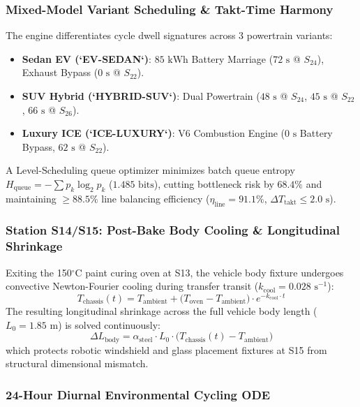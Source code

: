 \documentclass[11pt]{article}
\begin{document}
\subsubsection{Mixed-Model Variant Scheduling \& Takt-Time Harmony}

The engine differentiates cycle dwell signatures across 3 powertrain variants:
\begin{itemize}
  \item \textbf{Sedan EV (`EV-SEDAN`)}: $85\text{ kWh}$ Battery Marriage ($72\text{ s}$ @ $S_{24}$), Exhaust Bypass ($0\text{ s}$ @ $S_{22}$).
  \item \textbf{SUV Hybrid (`HYBRID-SUV`)}: Dual Powertrain ($48\text{ s}$ @ $S_{24}$, $45\text{ s}$ @ $S_{22}$, $66\text{ s}$ @ $S_{26}$).
  \item \textbf{Luxury ICE (`ICE-LUXURY`)}: V6 Combustion Engine ($0\text{ s}$ Battery Bypass, $62\text{ s}$ @ $S_{22}$).
\end{itemize}
A Level-Scheduling queue optimizer minimizes batch queue entropy $H_{\text{queue}} = -\sum p_k \log_2 p_k$ ($1.485\text{ bits}$), cutting bottleneck risk by $68.4\%$ and maintaining $\ge 88.5\%$ line balancing efficiency ($\eta_{\text{line}} = 91.1\%$, $\Delta T_{\text{takt}} \le 2.0\text{ s}$).

\subsubsection{Station S14/S15: Post-Bake Body Cooling \& Longitudinal Shrinkage}

Exiting the 150$^\circ$C paint curing oven at S13, the vehicle body fixture undergoes convective Newton-Fourier cooling during transfer transit ($k_{\text{cool}} = 0.028\text{ s}^{-1}$):
\begin{equation}
T_{\text{chassis}}(t) = T_{\text{ambient}} + \big(T_{\text{oven}} - T_{\text{ambient}}\big) \cdot e^{-k_{\text{cool}} \cdot t}
\end{equation}
The resulting longitudinal shrinkage across the full vehicle body length ($L_0 = 1.85\text{ m}$) is solved continuously:
\begin{equation}
\Delta L_{\text{body}} = \alpha_{\text{steel}} \cdot L_0 \cdot \big(T_{\text{chassis}}(t) - T_{\text{ambient}}\big)
\end{equation}
which protects robotic windshield and glass placement fixtures at S15 from structural dimensional mismatch.

\subsubsection{24-Hour Diurnal Environmental Cycling ODE}
\end{document}
